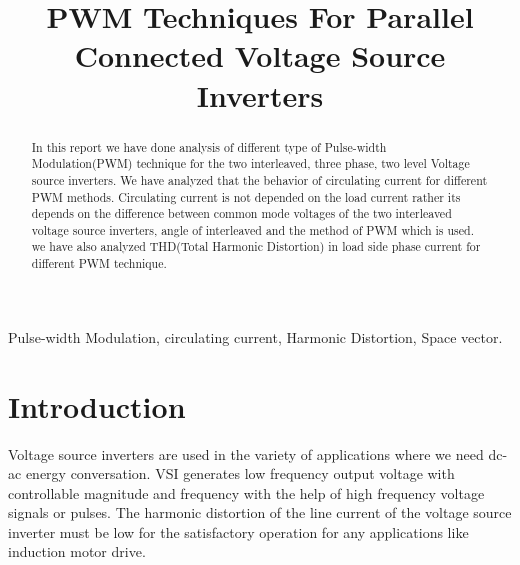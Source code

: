 \documentclass[conference]{IEEEtran}
\begin{document}
\title{\LARGE PWM Techniques For Parallel Connected Voltage Source Inverters}


 \author{}
 

\maketitle

\begin{abstract}
In this report we have done analysis of different type of Pulse-width Modulation(PWM) technique for the two interleaved, three phase, two level Voltage source inverters. We have analyzed that the behavior of circulating current for different PWM methods. Circulating current is not depended on the load current rather its depends on the difference between common mode voltages of the two interleaved voltage source inverters, angle of interleaved and the method of PWM which is used. we have also analyzed THD(Total Harmonic Distortion) in load side phase current for different PWM technique.
\end{abstract}

\IEEEoverridecommandlockouts
\begin{keywords}
Pulse-width Modulation, circulating current, Harmonic Distortion, Space vector.
\end{keywords}

\IEEEpeerreviewmaketitle



\section{Introduction}
Voltage source inverters are used in the variety of applications where we need dc-ac energy conversation. VSI generates low frequency output voltage with controllable magnitude and frequency with the help of high frequency voltage signals or pulses. The harmonic distortion of the line current of the voltage source inverter must be low for the satisfactory operation for any applications like induction motor drive. 
\end{document}
